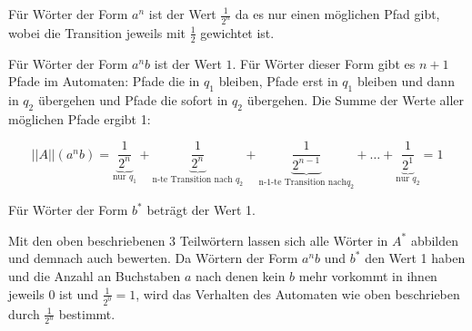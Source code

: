 \documentclass{scrartcl}
\begin{document}
Für Wörter der Form $a^n$ ist der Wert $\frac{1}{2^n}$ da es nur einen möglichen Pfad gibt, wobei die Transition jeweils mit $\frac{1}{2}$ gewichtet ist.

Für Wörter der Form $a^nb$ ist der Wert $1$. Für Wörter dieser Form gibt es $n+1$ Pfade im Automaten: Pfade die in $q_1$ bleiben, Pfade erst in $q_1$ bleiben und dann in $q_2$ übergehen und Pfade die sofort in $q_2$ übergehen. Die Summe der Werte aller möglichen Pfade ergibt 1:


\begin{equation*}
  ||A||(a^nb) = \underbrace{\frac{1}{2^n}}_{\text{nur } q_1} + \underbrace{\frac{1}{2^n}}_{\text{n-te Transition nach } q_2} + \underbrace{\frac{1}{2^{n-1}}}_{\text{n-1-te Transition nach} q_2} + \ldots + \underbrace{\frac{1}{2^1}}_{\text{nur } q_2} = 1
\end{equation*}

Für Wörter der Form $b^*$ beträgt der Wert 1.

Mit den oben beschriebenen 3 Teilwörtern lassen sich alle Wörter in $A^*$ abbilden und demnach auch bewerten. Da Wörtern der Form $a^nb$ und $b^*$ den Wert 1 haben und die Anzahl an Buchstaben $a$ nach denen kein $b$ mehr vorkommt in ihnen jeweils 0 ist und $\frac{1}{2^0} = 1$, wird das Verhalten des Automaten wie oben beschrieben durch $\frac{1}{2^n}$ bestimmt.
\end{document}
